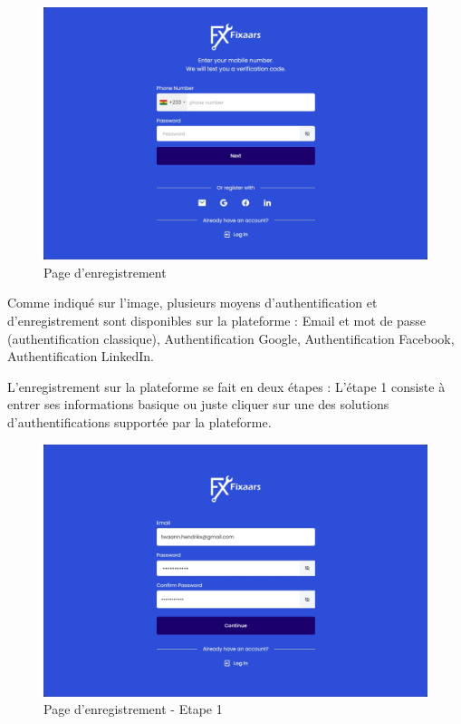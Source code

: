 {\begin{figure}[H]
\begin{center}
\includegraphics[width=12cm]{assets/demo/signup.png}
\end{center}
\caption{Page d'enregistrement}
\end{figure}

Comme indiqué sur l'image, plusieurs moyens d'authentification et d'enregistrement sont disponibles sur la plateforme : Email et mot de passe (authentification classique), Authentification Google, Authentification Facebook, Authentification LinkedIn.

\vspace{0.35cm}

L'enregistrement sur la plateforme se fait en deux étapes : L'étape 1 consiste à entrer ses informations basique ou juste cliquer sur une des solutions d'authentifications supportée par la plateforme.

\begin{figure}[H]
\begin{center}
\includegraphics[width=12cm]{assets/demo/signup-email.png}
\end{center}
\caption{Page d'enregistrement - Etape 1}
\end{figure}

}
